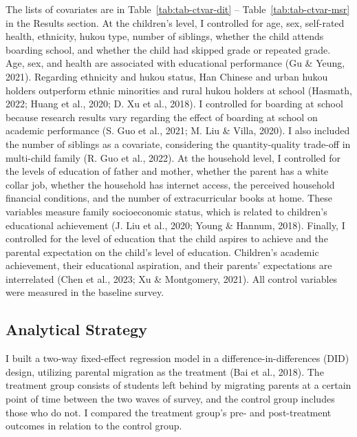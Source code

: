 \documentclass[
  man,floatsintext]{apa7}
\begin{document}
The lists of covariates are in Table~\ref{tab:tab-ctvar-dit} -- Table~\ref{tab:tab-ctvar-msr} in the Results section. At the children's level, I controlled for age, sex, self-rated health, ethnicity, hukou type, number of siblings, whether the child attends boarding school, and whether the child had skipped grade or repeated grade. Age, sex, and health are associated with educational performance (Gu \& Yeung, 2021). Regarding ethnicity and hukou status, Han Chinese and urban hukou holders outperform ethnic minorities and rural hukou holders at school (Hasmath, 2022; Huang et al., 2020; D. Xu et al., 2018). I controlled for boarding at school because research results vary regarding the effect of boarding at school on academic performance (S. Guo et al., 2021; M. Liu \& Villa, 2020). I also included the number of siblings as a covariate, considering the quantity-quality trade-off in multi-child family (R. Guo et al., 2022). At the household level, I controlled for the levels of education of father and mother, whether the parent has a white collar job, whether the household has internet access, the perceived household financial conditions, and the number of extracurricular books at home. These variables measure family socioeconomic status, which is related to children's educational achievement (J. Liu et al., 2020; Young \& Hannum, 2018). Finally, I controlled for the level of education that the child aspires to achieve and the parental expectation on the child's level of education. Children's academic achievement, their educational aspiration, and their parents' expectations are interrelated (Chen et al., 2023; Xu \& Montgomery, 2021). All control variables were measured in the baseline survey.

\hypertarget{analytical-strategy}{%
\subsection{Analytical Strategy}\label{analytical-strategy}}

I built a two-way fixed-effect regression model in a difference-in-differences (DID) design, utilizing parental migration as the treatment (Bai et al., 2018). The treatment group consists of students left behind by migrating parents at a certain point of time between the two waves of survey, and the control group includes those who do not. I compared the treatment group's pre- and post-treatment outcomes in relation to the control group.
\end{document}
